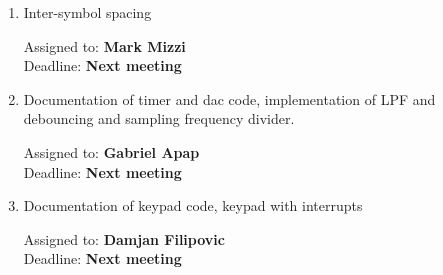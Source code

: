 \documentclass[11pt,a4paper]{scrartcl}
\begin{document}
\begin{enumerate}

\item Inter-symbol spacing
\begin{flushright}
Assigned to: \textbf{Mark Mizzi} \\
Deadline: \textbf{Next meeting}
\end{flushright}

\item Documentation of timer and dac code, implementation of LPF and debouncing and sampling frequency divider.
\begin{flushright}
Assigned to: \textbf{Gabriel Apap} \\
Deadline: \textbf{Next meeting}
\end{flushright}

\item Documentation of keypad code, keypad with interrupts
\begin{flushright}
Assigned to: \textbf{Damjan Filipovic} \\
Deadline: \textbf{Next meeting}
\end{flushright}


\end{enumerate}
\end{document}
